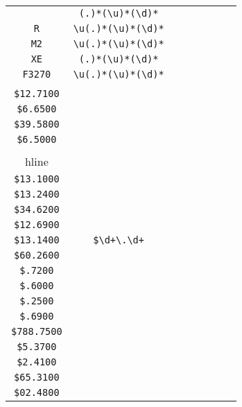 \begin{longtable}{cccccccc}
\begin{tabular}{ll}
    \verb|| & \verb|(.)*(\u)*(\d)*|\\
\verb|R| & \verb|\u(.)*(\u)*(\d)*|\\
\verb|M2| & \verb|\u(.)*(\u)*(\d)*|\\
\verb|XE| & \verb|(.)*(\u)*(\d)*|\\
\verb|F3270| & \verb|\u(.)*(\u)*(\d)*|
\end{tabular}
\\\midrule 
\begin{tabular}{l}
    \verb|$6.5100|\\
\verb|$12.7100|\\
\verb|$6.6500|\\
\verb|$39.5800|\\
\verb|$6.5000|\\
\\hline\\
\verb|$13.1000|\\
\verb|$13.2400|\\
\verb|$34.6200|\\
\verb|$12.6900|\\
\verb|$13.1400|
\end{tabular}

&
\verb|$\d+\.\d+|
&

\begin{tabular}{l}
    \verb|$(\d)*\.\d\d00|\\
\verb|$60.2600|\\
\verb|$.7200|\\
\verb|$.6000|\\
\verb|$.2500|\\
\verb|$.6900|
\end{tabular}

&

\begin{tabular}{l}
    \verb|$\d(\d)*\.\d\d00|\\
\verb|$788.7500|\\
\verb|$5.3700|\\
\verb|$2.4100|\\
\verb|$65.3100|\\
\verb|$02.4800|
\end{tabular}

&


\end{longtable}
